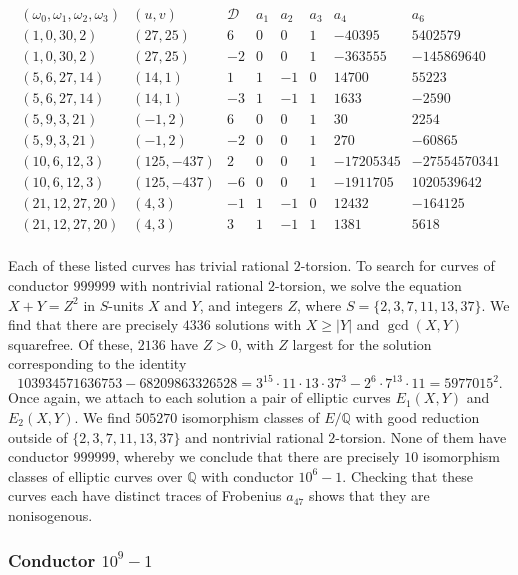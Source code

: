 $$
\begin{array}{c|c|c|c|c|c|c|c} 
(\omega_0,\omega_1,\omega_2,\omega_3) & (u,v) & \mathcal{D} & a_1 & a_2 & a_3 & a_4 & a_6 \\ \hline
(1,0,30,2) & (27,25) & 6 & 0 & 0 & 1 & -40395 & 5402579  \\
(1,0,30,2) & (27,25) & -2 & 0 & 0 & 1 & -363555 & -145869640  \\
(5,6,27,14) & (14,1) & 1 & 1 & -1 & 0 & 14700 & 55223 \\
(5,6,27,14) & (14,1) & -3 & 1 & -1 & 1 & 1633 & -2590 \\
(5,9,3,21) & (-1,2) & 6 & 0 & 0 & 1 & 30 & 2254 \\
(5,9,3,21) & (-1,2) & -2 & 0 & 0 & 1 & 270 & -60865 \\
(10,6,12,3) & (125,-437) & 2 & 0 & 0 & 1 & -17205345 & -27554570341 \\
(10,6,12,3) & (125,-437) & -6 & 0 & 0 & 1 & -1911705 & 1020539642 \\
(21,12,27,20) & (4,3) & -1 & 1 & -1 & 0 & 12432 & -164125 \\
(21,12,27,20) & (4,3) & 3 & 1 & -1 & 1 & 1381 & 5618 \\
\end{array}
$$ 

Each of these listed curves has trivial rational $2$-torsion. To search for curves of conductor $999999$ with nontrivial rational $2$-torsion, we solve the equation $X+Y=Z^2$ in $S$-units $X$ and $Y$, and integers $Z$, where $S=\{2,3,7, 11,13, 37 \}$.
We find that there are precisely $4336$ solutions with $X \geq |Y|$ and  $\gcd (X,Y)$ squarefree. Of these, $2136$ have $Z > 0$, with $Z$ largest for the solution corresponding to the identity
$$
103934571636753 - 68209863326528 = 3^{15} \cdot 11 \cdot 13 \cdot 37^3 - 2^6 \cdot 7^{13} \cdot 11 =   5977015^2.
$$
Once again, we attach to each solution a pair of elliptic curves $E_1(X,Y)$ and $E_2(X,Y)$. We find $505270$ isomorphism classes of $E/\mathbb{Q}$ with good reduction outside of $\{ 2, 3, 7, 11, 13, 37 \}$ and nontrivial rational $2$-torsion. None of them have  conductor $999999$, whereby we conclude that there are precisely  $10$ isomorphism classes of elliptic curves over $\mathbb{Q}$ with conductor $10^6-1$. Checking that these curves each have distinct traces of Frobenius $a_{47}$ shows that they are nonisogenous.


\subsubsection{Conductor $10^9-1$}  \label{exe3}
 
